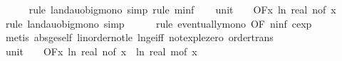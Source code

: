 \begin{isabellebody}
\ \ \ \ \isamarkupfalse%
\ {\isacharparenleft}{\kern0pt}rule\ landau{\isacharunderscore}{\kern0pt}o{\isachardot}{\kern0pt}big{\isacharunderscore}{\kern0pt}mono{\isacharcomma}{\kern0pt}\ simp{\isacharcomma}{\kern0pt}\ rule\ m{\isacharunderscore}{\kern0pt}inf{\isacharparenright}{\kern0pt}\isanewline
\isanewline
\ \ \isamarkupfalse%
\ unit{\isacharunderscore}{\kern0pt}{}{\isacharcolon}{\kern0pt}\ {\isachardoublequoteopen}{\isacharparenleft}{\kern0pt}{\isasymlambda}{\isacharunderscore}{\kern0pt}{\isachardot}{\kern0pt}\ {}{\isacharparenright}{\kern0pt}\ {\isasymin}\ O{\isacharbrackleft}{\kern0pt}{\isacharquery}{\kern0pt}F{\isacharbrackright}{\kern0pt}{\isacharparenleft}{\kern0pt}{\isasymlambda}x{\isachardot}{\kern0pt}\ ln\ {\isacharparenleft}{\kern0pt}real\ {\isacharparenleft}{\kern0pt}n{\isacharunderscore}{\kern0pt}of\ x{\isacharparenright}{\kern0pt}{\isacharparenright}{\kern0pt}{\isacharparenright}{\kern0pt}{\isachardoublequoteclose}\isanewline
\ \ \ \ \isamarkupfalse%
\ {\isacharparenleft}{\kern0pt}rule\ landau{\isacharunderscore}{\kern0pt}o{\isachardot}{\kern0pt}big{\isacharunderscore}{\kern0pt}mono{\isacharcomma}{\kern0pt}\ simp{\isacharparenright}{\kern0pt}\isanewline
\ \ \ \ \isamarkupfalse%
\ {\isacharparenleft}{\kern0pt}rule\ eventually{\isacharunderscore}{\kern0pt}mono\ {\isacharbrackleft}{\kern0pt}OF\ n{\isacharunderscore}{\kern0pt}inf{\isacharbrackleft}{\kern0pt}\ c{\isacharequal}{\kern0pt}{\isachardoublequoteopen}exp\ {}{\isachardoublequoteclose}{\isacharbrackright}{\kern0pt}{\isacharbrackright}{\kern0pt}{\isacharparenright}{\kern0pt}\ \isanewline
\ \ \ \ \isamarkupfalse%
\ {\isacharparenleft}{\kern0pt}metis\ abs{\isacharunderscore}{\kern0pt}ge{\isacharunderscore}{\kern0pt}self\ linorder{\isacharunderscore}{\kern0pt}not{\isacharunderscore}{\kern0pt}le\ ln{\isacharunderscore}{\kern0pt}ge{\isacharunderscore}{\kern0pt}iff\ not{\isacharunderscore}{\kern0pt}exp{\isacharunderscore}{\kern0pt}le{\isacharunderscore}{\kern0pt}zero\ order{\isachardot}{\kern0pt}trans{\isacharparenright}{\kern0pt}\isanewline
\isanewline
\ \ \isamarkupfalse%
\ unit{\isacharunderscore}{\kern0pt}{}{\isacharcolon}{\kern0pt}\ {\isachardoublequoteopen}{\isacharparenleft}{\kern0pt}{\isasymlambda}{\isacharunderscore}{\kern0pt}{\isachardot}{\kern0pt}\ {}{\isacharparenright}{\kern0pt}\ {\isasymin}\ O{\isacharbrackleft}{\kern0pt}{\isacharquery}{\kern0pt}F{\isacharbrackright}{\kern0pt}{\isacharparenleft}{\kern0pt}{\isasymlambda}x{\isachardot}{\kern0pt}\ ln\ {\isacharparenleft}{\kern0pt}real\ {\isacharparenleft}{\kern0pt}n{\isacharunderscore}{\kern0pt}of\ x{\isacharparenright}{\kern0pt}{\isacharparenright}{\kern0pt}\ {\isacharplus}{\kern0pt}\ ln\ {\isacharparenleft}{\kern0pt}real\ {\isacharparenleft}{\kern0pt}m{\isacharunderscore}{\kern0pt}of\ x{\isacharparenright}{\kern0pt}{\isacharparenright}{\kern0pt}{\isacharparenright}{\kern0pt}{\isachardoublequoteclose}\isanewline

\end{isabellebody}
